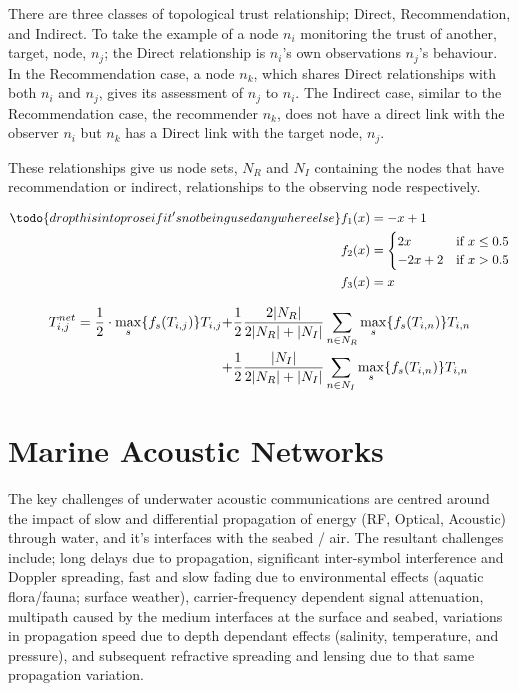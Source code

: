 \documentclass[runningheads,a4paper]{llncs}
\begin{document}
There are three classes of topological trust relationship; Direct, Recommendation, and Indirect.
To take the example of a node $n_i$ monitoring the trust of another, target, node, $n_j$; the Direct relationship is $n_i$'s own observations $n_j$'s behaviour.
In the Recommendation case, a node $n_k$, which shares Direct relationships with both $n_i$ and $n_j$, gives its assessment of $n_j$ to $n_i$.
The Indirect case, similar to the Recommendation case, the recommender $n_k$, does not have a direct link with the observer $n_i$ but $n_k$ has a Direct link with the target node, $n_j$.

These relationships give us node sets, $N_R$ and $N_I$ containing the nodes that have recommendation or indirect, relationships to the observing node respectively.

\begin{align}\todo{drop this into prose if it's not being used anywhere else}
  \label{eq:whitenization}
  f_1(x) &= -x+1\notag\\
  f_2(x) &= 
  \begin{cases}
    2x & \text{if }x\leq 0.5\\
    -2x+2 & \text{if }x>0.5
  \end{cases}\\
  f_3(x) &= x\notag
\end{align}

\begin{align}
  \label{eq:networkeffects}
  T_{i,j}^{net}=\frac{1}{2} \cdot \max_s\{f_s(T_{i,j})\} T_{i,j}+&\frac{1}{2} \frac{2|N_R| }{2|N_R| + |N_I|}\sum_{n \in N_R} \max_s\{f_s(T_{i,n})\} T_{i,n}\\ \notag
  +&\frac{1}{2} \frac{|N_I| }{2|N_R| + |N_I|}\sum_{n \in N_I} \max_s\{f_s(T_{i,n})\} T_{i,n} 
\end{align}

\section{Marine Acoustic Networks}\label{sec:marineacousticnetworks}

The key challenges of underwater acoustic communications are centred around the impact of slow and differential propagation of energy (RF, Optical, Acoustic) through water, and it's interfaces with the seabed / air.
The resultant challenges include; long delays due to propagation, significant inter-symbol interference and Doppler spreading, fast and slow fading due to environmental effects (aquatic flora/fauna; surface weather), carrier-frequency dependent signal attenuation, multipath caused by the medium interfaces at the surface and seabed, variations in propagation speed due to depth dependant effects (salinity, temperature, and pressure), and subsequent refractive spreading and lensing due to that same propagation variation\cite{Partan2006}.
\end{document}
